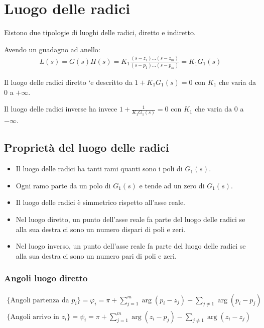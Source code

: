 \chapter{Luogo delle radici}


Eistono due tipologie di luoghi delle radici, diretto e indiretto.

Avendo un guadagno ad anello:
\begin{align}
  L(s) = G(s)H(s) = K_1 \frac{(s-z_1)\dots(s-z_m)}{(s-p_1)\dots(s-p_m)} = K_1G_1(s)
\end{align}

Il luogo delle radici diretto `e descritto da $1 + K_1G_1(s) = 0$ con $K_1$ che varia 
da $0$ a $+\infty$.

Il luogo delle radici inverse ha invece $1 + \frac{1}{K_1G_1(s)} = 0$ con $K_1$ che varia
da $0$ a $-\infty$.


\section{Propriet\`a del luogo delle radici}
\begin{itemize}
  \item Il luogo delle radici ha tanti rami quanti sono i poli di $G_1(s)$.
  \item Ogni ramo parte da un polo di $G_1(s)$ e tende ad un zero di $G_1(s)$.
  \item Il luogo delle radici \`e simmetrico rispetto all'asse reale.
  \item Nel luogo diretto, un punto dell'asse reale fa parte del luogo delle radici se alla sua destra ci sono un numero dispari di poli e zeri.
  \item Nel luogo inverso, un punto dell'asse reale fa parte del luogo delle radici se alla sua destra ci sono un numero pari di poli e zeri.
\end{itemize}




\subsection{Angoli luogo diretto}

\begin{align}
  \{ \text{Angoli partenza da $p_i$} \} = \varphi_i = \pi + \sum_{j = 1}^m \arg(p_i - z_j) - \sum_{j \neq 1} \arg(p_i - p_j) \\
  \{ \text{Angoli arrivo in $z_i$} \} = \psi_i = \pi + \sum_{j = 1}^m \arg(z_i - p_j) - \sum_{j \neq 1} \arg(z_i - z_j)
\end{align}



